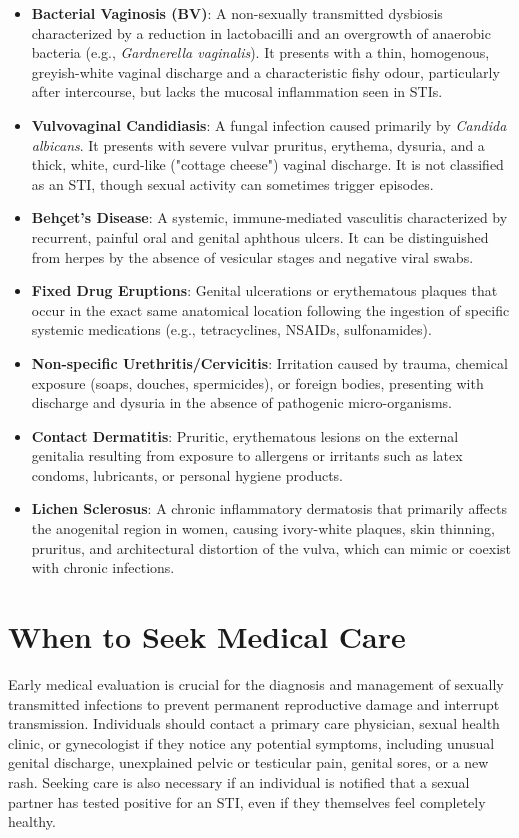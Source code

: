 \begin{itemize}
    \item \textbf{Bacterial Vaginosis (BV)}: A non-sexually transmitted dysbiosis characterized by a reduction in lactobacilli and an overgrowth of anaerobic bacteria (e.g., \textit{Gardnerella vaginalis}). It presents with a thin, homogenous, greyish-white vaginal discharge and a characteristic fishy odour, particularly after intercourse, but lacks the mucosal inflammation seen in STIs.
    \item \textbf{Vulvovaginal Candidiasis}: A fungal infection caused primarily by \textit{Candida albicans}. It presents with severe vulvar pruritus, erythema, dysuria, and a thick, white, curd-like ("cottage cheese") vaginal discharge. It is not classified as an STI, though sexual activity can sometimes trigger episodes.
    \item \textbf{Beh\c{c}et's Disease}: A systemic, immune-mediated vasculitis characterized by recurrent, painful oral and genital aphthous ulcers. It can be distinguished from herpes by the absence of vesicular stages and negative viral swabs.
    \item \textbf{Fixed Drug Eruptions}: Genital ulcerations or erythematous plaques that occur in the exact same anatomical location following the ingestion of specific systemic medications (e.g., tetracyclines, NSAIDs, sulfonamides).
    \item \textbf{Non-specific Urethritis/Cervicitis}: Irritation caused by trauma, chemical exposure (soaps, douches, spermicides), or foreign bodies, presenting with discharge and dysuria in the absence of pathogenic micro-organisms.
    \item \textbf{Contact Dermatitis}: Pruritic, erythematous lesions on the external genitalia resulting from exposure to allergens or irritants such as latex condoms, lubricants, or personal hygiene products.
    \item \textbf{Lichen Sclerosus}: A chronic inflammatory dermatosis that primarily affects the anogenital region in women, causing ivory-white plaques, skin thinning, pruritus, and architectural distortion of the vulva, which can mimic or coexist with chronic infections.
\end{itemize}

\section*{When to Seek Medical Care}
Early medical evaluation is crucial for the diagnosis and management of sexually transmitted infections to prevent permanent reproductive damage and interrupt transmission. Individuals should contact a primary care physician, sexual health clinic, or gynecologist if they notice any potential symptoms, including unusual genital discharge, unexplained pelvic or testicular pain, genital sores, or a new rash. Seeking care is also necessary if an individual is notified that a sexual partner has tested positive for an STI, even if they themselves feel completely healthy.

